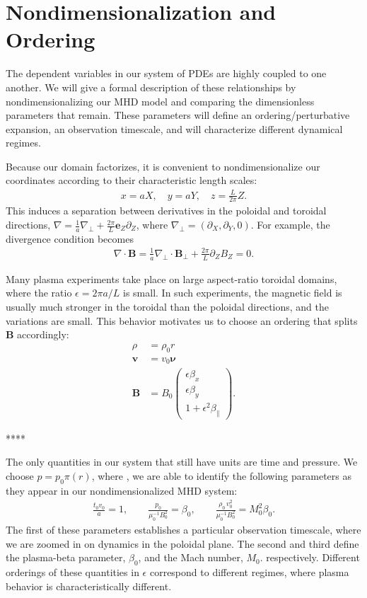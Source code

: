 \documentclass{article}
\newcommand{\para}{\parallel}
\newcommand{\ep}{\epsilon}
\newcommand{\np}{\nabla_\perp}
\newcommand{\p}{\partial}
\newcommand{\pth} [1] {\left( #1 \right) }
\newcommand{\pmat} [1] {\begin{pmatrix} #1 \end{pmatrix}}
\begin{document}
\section{Nondimensionalization and Ordering} 
The dependent variables in our system of PDEs are highly coupled to one another. We will give a formal description of these relationships by nondimensionalizing our MHD model and comparing the dimensionless parameters that remain. These parameters will define an ordering/perturbative expansion, an observation timescale, and will characterize different dynamical regimes. 

Because our domain factorizes, it is convenient to nondimensionalize our coordinates according to their characteristic length scales: 
\begin{align*}
    x=aX,\quad y=aY,\quad z=\frac{L}{2\pi}Z.
\end{align*}
This induces a separation between derivatives in the poloidal and toroidal directions, $\nabla = \frac{1}{a}\np + \frac{2\pi}{L}\bm{e}_Z\p_Z$, where $\np = \pth{\p_X, \p_Y, 0}$. For example, the divergence condition becomes   
\begin{align*}
    \nabla\cdot\bm{B} = \frac{1}{a}\np\cdot\bm{B}_\perp + \frac{2\pi}{L}\p_ZB_Z = 0. 
\end{align*}

Many plasma experiments take place on large aspect-ratio toroidal domains, where the ratio $\ep = 2\pi a/L$ is small. In such experiments, the magnetic field is usually much stronger in the toroidal than the poloidal directions, and the variations are small. This behavior motivates us to choose an ordering that splits $\bm{B}$ accordingly: 
\begin{align*}
    \rho &= \rho_0 r \\
    \bm{v} &= v_0 \bm{\nu} \\ 
    \bm{B} &= B_0 \pmat{\ep\beta_x \\ \ep\beta_y \\ 1+\ep^2\beta_\para}. 
\end{align*}

****

The only quantities in our system that still have units are time and pressure. We choose $p=p_0\pi(r)$, where , we are able to identify the following parameters as they appear in our nondimensionalized MHD system:  
\begin{align*}
    \frac{t_0 v_0}{a} = 1, \qquad 
    \frac{p_0}{\mu_0^{-1}B_0^2} = \beta_0, \qquad 
    \frac{\rho_0\,v_0^2}{\mu_0^{-1}B_0^2} = M_0^2\beta_0. 
\end{align*}
The first of these parameters establishes a particular observation timescale, where we are zoomed in on dynamics in the poloidal plane. The second and third define the plasma-beta parameter, $\beta_0$, and the Mach number, $M_0$. respectively. Different orderings of these quantities in $\ep$ correspond to different regimes, where plasma behavior is characteristically different. 
\end{document}
